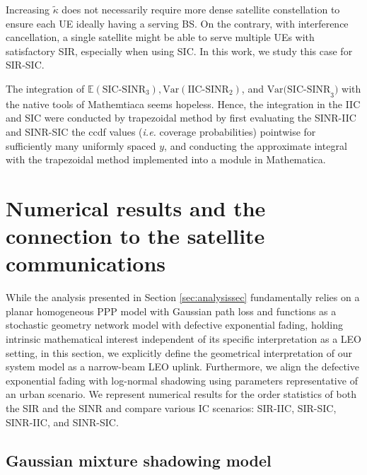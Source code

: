 \documentclass[lettersize,journal]{IEEEtran}
\begin{document}
  Increasing $\tilde{\kappa}$ does not necessarily require more dense satellite constellation to ensure each UE ideally having a serving BS. On the contrary, with interference cancellation, a single satellite might be able to serve multiple UEs with satisfactory SIR, especially when using SIC. In this work, we study this case for SIR-SIC.



  The integration of $\mathbb{E}(\text{SIC-SINR}_{3}),\text{Var}(\text{IIC-SINR}_{2})$, and $\text{Var(SIC-SINR}_{3})$ with the native tools of Mathemtiaca seems hopeless. Hence, the integration in the IIC and SIC were conducted by trapezoidal method by first evaluating the SINR-IIC and SINR-SIC the ccdf values (\textit{i.e.} coverage probabilities) pointwise for sufficiently many uniformly spaced $y$, and conducting the approximate integral with the trapezoidal method implemented into a module in Mathematica.  

  






\section{Numerical results and the connection to the satellite communications}

\label{sec:numericalresultsandconnectiontoLEO}
While the analysis presented in Section \ref{sec:analysissec} fundamentally relies on a planar homogeneous PPP model with Gaussian path loss and functions as a stochastic geometry network model with defective exponential fading, holding intrinsic mathematical interest independent of its specific interpretation as a LEO setting, in this section, we explicitly define the geometrical interpretation of our system model as a narrow-beam LEO uplink. Furthermore, we align the defective exponential fading with log-normal shadowing using parameters representative of an urban scenario. We represent numerical results for the order statistics of both the SIR and the SINR and compare various IC scenarios: SIR-IIC, SIR-SIC, SINR-IIC, and SINR-SIC.



\subsection{Gaussian mixture shadowing model}
\label{sec:guassianmixture}
\end{document}

